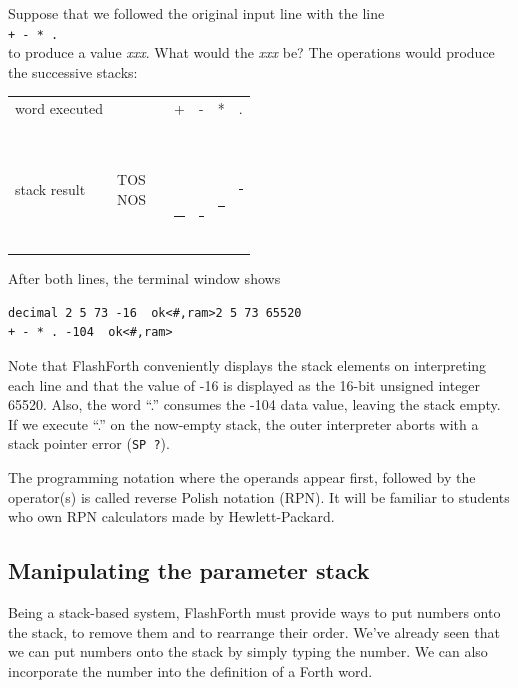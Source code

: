 \documentclass[12pt,a4paper]{article}
\begin{document}
\medskip
Suppose that we followed the original input line with the line \vspace{7pt} \\
\verb!+ - * .! \fbox{$\hookleftarrow$} \vspace{7pt} \\
to produce a value  \textit{xxx}.
What would the \textit{xxx} be?
The operations would produce the successive stacks:
\begin{center}
 \begin{tabular}{lc|ccccc}
 word executed & & & + & - & * & . \\
 \\
 stack result  
 & \parbox[t]{35pt}{TOS \\ NOS} 
 & \parbox[t]{30pt}{ \\  \\  \\  \\ \rule{30pt}{2pt}} 
 & \parbox[t]{30pt}{ \  \\  \\ \rule{30pt}{2pt}}
 & \parbox[t]{30pt}{ \\  \\ \rule{30pt}{2pt}}
 & \parbox[t]{30pt}{ \\ \rule{30pt}{2pt}}
 & \parbox[t]{30pt}{\rule{30pt}{2pt}} \\
 \end{tabular}
\end{center}
After both lines, the terminal window shows
\begin{verbatim}
decimal 2 5 73 -16  ok<#,ram>2 5 73 65520 
+ - * . -104  ok<#,ram>
\end{verbatim}
Note that FlashForth conveniently displays the stack elements on interpreting each line 
and that the value of -16 is displayed as the 16-bit unsigned integer 65520.
Also, the word ``.'' consumes the -104 data value, leaving the stack empty.
If we execute ``.'' on the now-empty stack, the outer interpreter aborts with
a stack pointer error (\verb!SP ?!).

\medskip
The programming notation where the operands appear first,
followed by the operator(s) is called reverse Polish notation (RPN).
It will be familiar to students who own RPN calculators made by Hewlett-Packard.


\medskip
\subsection{Manipulating the parameter stack}
\label{sec:parameter-stack}
%
Being a stack-based system, FlashForth must provide ways to put numbers onto the stack,
to remove them and to rearrange their order.
We've already seen that we can put numbers onto the stack by simply typing the number.
We can also incorporate the number into the definition of a Forth word.
\end{document}
